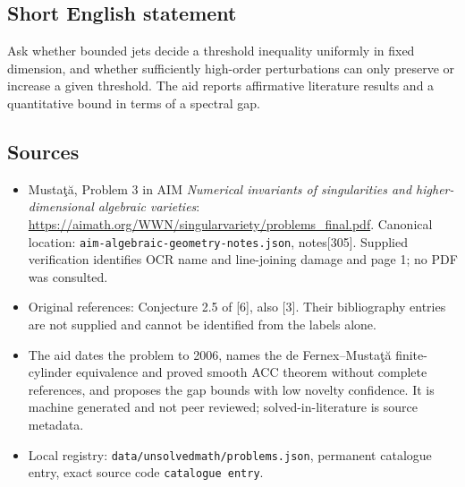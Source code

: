 \documentclass[11pt]{article}
\begin{document}
\subsection{Short English statement}
Ask whether bounded jets decide a threshold inequality uniformly in fixed dimension, and whether sufficiently high-order perturbations can only preserve or increase a given threshold. The aid reports affirmative literature results and a quantitative bound in terms of a spectral gap.
\subsection{Sources}
\begin{itemize}
\item Musta\c t\u a, Problem 3 in AIM \emph{Numerical invariants of singularities and higher-dimensional algebraic varieties}: \url{https://aimath.org/WWN/singularvariety/problems_final.pdf}. Canonical location: \texttt{aim-algebraic-geometry-notes.json}, notes[305]. Supplied verification identifies OCR name and line-joining damage and page 1; no PDF was consulted.
\item Original references: Conjecture 2.5 of [6], also [3]. Their bibliography entries are not supplied and cannot be identified from the labels alone.
\item The aid dates the problem to 2006, names the de Fernex--Musta\c t\u a finite-cylinder equivalence and proved smooth ACC theorem without complete references, and proposes the gap bounds with low novelty confidence. It is machine generated and not peer reviewed; solved-in-literature is source metadata.
\item Local registry: \texttt{data/unsolvedmath/problems.json}, permanent catalogue entry, exact source code \texttt{catalogue entry}.
\end{itemize}
\end{document}
